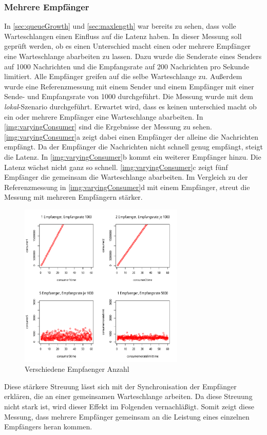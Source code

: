 \subsubsection{Mehrere Empfänger}
In \autoref{sec:queueGrowth} und \autoref{sec:maxlength} war bereits zu sehen, dass volle Warteschlangen einen Einfluss auf die Latenz haben. In dieser Messung soll geprüft werden, ob es einen Unterschied macht einen oder mehrere Empfänger eine Warteschlange abarbeiten zu lassen. Dazu wurde die Senderate eines Senders auf 1000 Nachrichten und die Empfangsrate auf 200 Nachrichten pro Sekunde limitiert. Alle Empfänger greifen auf die selbe Warteschlange zu. Außerdem wurde eine Referenzmessung mit einem Sender und einem Empfänger mit einer Sende- und Empfangsrate von 1000 durchgeführt. Die Messung wurde mit dem \textit{lokal}-Szenario durchgeführt. Erwartet wird, dass es keinen unterschied macht ob ein oder mehrere Empfänger eine Warteschlange abarbeiten.
In \autoref{img:varyingConsumer} sind die Ergebnisse der Messung zu sehen. \autoref{img:varyingConsumer}a zeigt dabei einen Empfänger der alleine die Nachrichten empfängt. Da der Empfänger die Nachrichten nicht schnell genug empfängt, steigt die Latenz. In \autoref{img:varyingConsumer}b kommt ein weiterer Empfänger hinzu. Die Latenz wächst nicht ganz so schnell. \autoref{img:varyingConsumer}c zeigt fünf Empfänger die gemeinsam die Warteschlange abarbeiten. Im Vergleich zu der Referenzmessung in \autoref{img:varyingConsumer}d mit einem Empfänger, streut die Messung mit mehreren Empfängern stärker.
\begin{figure}
\center
  \includegraphics[width=0.7\textwidth]{images/measurement/varying-consumer.pdf}
  \caption{Verschiedene Empfaenger Anzahl}
  \label{img:varyingConsumer}
\end{figure}
Diese stärkere Streuung lässt sich mit der Synchronisation der Empfänger erklären, die an einer gemeinsamen Warteschlange arbeiten. Da diese Streuung nicht stark ist, wird dieser Effekt im Folgenden vernachläßigt. Somit zeigt diese Messung, dass mehrere Empfänger gemeinsam an die Leistung eines einzelnen Empfängers heran kommen. 

